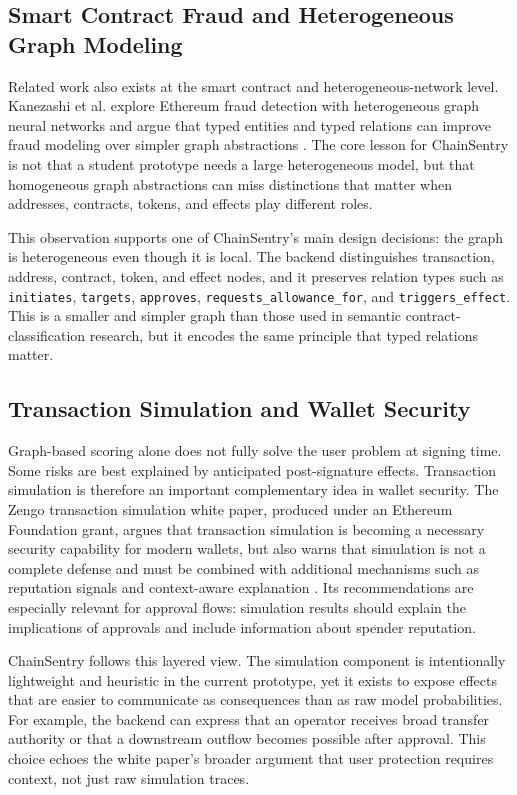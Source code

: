\documentclass[11pt]{article}
\begin{document}
\subsection{Smart Contract Fraud and Heterogeneous Graph Modeling}

Related work also exists at the smart contract and heterogeneous-network level. Kanezashi et al. explore Ethereum fraud detection with heterogeneous graph neural networks and argue that typed entities and typed relations can improve fraud modeling over simpler graph abstractions \cite{kanezashi2022hetero}. The core lesson for ChainSentry is not that a student prototype needs a large heterogeneous model, but that homogeneous graph abstractions can miss distinctions that matter when addresses, contracts, tokens, and effects play different roles.

This observation supports one of ChainSentry's main design decisions: the graph is heterogeneous even though it is local. The backend distinguishes transaction, address, contract, token, and effect nodes, and it preserves relation types such as \texttt{initiates}, \texttt{targets}, \texttt{approves}, \texttt{requests\_allowance\_for}, and \texttt{triggers\_effect}. This is a smaller and simpler graph than those used in semantic contract-classification research, but it encodes the same principle that typed relations matter.

\subsection{Transaction Simulation and Wallet Security}

Graph-based scoring alone does not fully solve the user problem at signing time. Some risks are best explained by anticipated post-signature effects. Transaction simulation is therefore an important complementary idea in wallet security. The Zengo transaction simulation white paper, produced under an Ethereum Foundation grant, argues that transaction simulation is becoming a necessary security capability for modern wallets, but also warns that simulation is not a complete defense and must be combined with additional mechanisms such as reputation signals and context-aware explanation \cite{beery2025simulation}. Its recommendations are especially relevant for approval flows: simulation results should explain the implications of approvals and include information about spender reputation.

ChainSentry follows this layered view. The simulation component is intentionally lightweight and heuristic in the current prototype, yet it exists to expose effects that are easier to communicate as consequences than as raw model probabilities. For example, the backend can express that an operator receives broad transfer authority or that a downstream outflow becomes possible after approval. This choice echoes the white paper's broader argument that user protection requires context, not just raw simulation traces.
\end{document}
